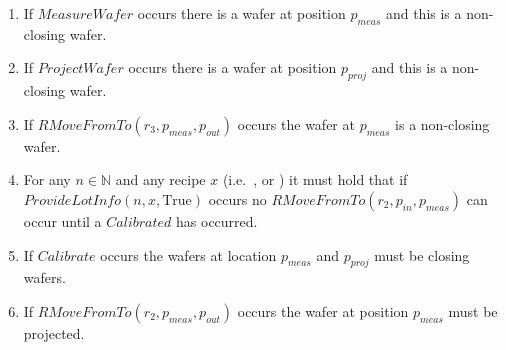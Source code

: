 \begin{enumerate}
    \item If $\mathit{MeasureWafer}$ occurs there is a wafer at position $p_\mathit{meas}$ and this is a non-closing wafer.

    \item If $\mathit{ProjectWafer}$ occurs there is a wafer at position $p_\mathit{proj}$ and this is a non-closing wafer.

    \item If $\mathit{RMoveFromTo}(r_3,p_\mathit{meas}, p_\mathit{out})$ occurs the wafer at $p_\mathit{meas}$ is a non-closing wafer.

    \item For any $n \in \mathbb{N}$ and any recipe $x$ (i.e.\ \recipeOne, \recipeTwo or \recipeThree) it must hold that if $\mathit{ProvideLotInfo}(n, x, \text{True})$ occurs no $\mathit{RMoveFromTo}(r_2, p_\mathit{in}, p_\mathit{meas})$ can occur until a $\mathit{Calibrated}$ has occurred.

    \item If $\mathit{Calibrate}$ occurs the wafers at location $p_\mathit{meas}$ and $p_\mathit{proj}$ must be closing wafers.

    \item If $\mathit{RMoveFromTo}\left(r_2, p_\mathit{meas}, p_\mathit{out}\right)$ occurs the wafer at position $p_\mathit{meas}$ must be projected.
\end{enumerate}
